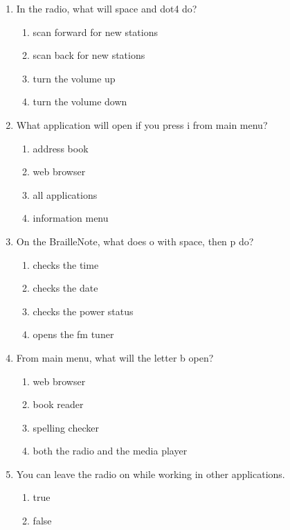 \documentclass[10pt,letterpaper,twoside]{report}
\begin{document}
{{{\begin{enumerate}
\begin{enumerate}
		      \item m
		      \item t
	      \end{enumerate}
	\item In the radio, what will space and dot4 do?
	      \begin{enumerate}
		      \item scan forward for new stations
		      \item scan back for new stations
		      \item turn the volume up
		      \item turn the volume down
	      \end{enumerate}
	\item What application will open if you press i from main menu?
	      \begin{enumerate}
		      \item address book
		      \item web browser
		      \item all applications
		      \item information menu
	      \end{enumerate}
	\item On the BrailleNote, what does o with space, then p do?
	      \begin{enumerate}
		      \item checks the time
		      \item checks the date
		      \item checks the power status
		      \item opens the fm tuner
	      \end{enumerate}
	\item From main menu, what will the letter b open?
	      \begin{enumerate}
		      \item web browser
		      \item book reader
		      \item spelling checker
		      \item both the radio and the media player
	      \end{enumerate}
	\item You can leave the radio on while working in other applications.
	      \begin{enumerate}
		      \item true
		      \item false
	      \end{enumerate}
\end{enumerate}

}}}
\end{document}
